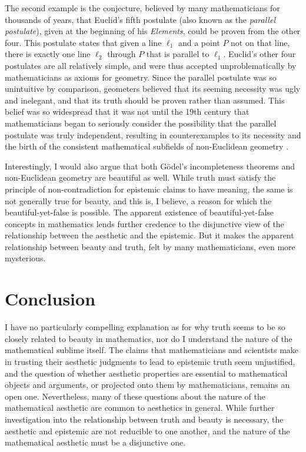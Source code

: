 \documentclass[a4paper,man,natbib]{apa6}
\begin{document}
The second example is the conjecture, believed by many mathematicians for thousands of years, that Euclid's fifth
postulate (also known as the \textit{parallel postulate}), given at the beginning of his \textit{Elements}, could 
be proven from the other four. This postulate states that given a line $\ell_1$ and a point $P$ not on that line, 
there is exactly one line $\ell_2$ through $P$ that is parallel to $\ell_1$. Euclid's other four postulates are all 
relatively simple, 
and were thus accepted unproblematically by mathematicians as axioms for geometry. Since the parallel
postulate was so unintuitive by comparison, geometers believed that its seeming necessity was ugly and inelegant, and
that its truth should be proven rather than assumed. This belief was so widespread that it was not until
the 19th century that mathematicians began to seriously consider the possibility that the parallel postulate was
truly independent, resulting in counterexamples to its necessity and the birth of the consistent mathematical
subfields of non-Euclidean geometry \citep{sep-epistemology-geometry}. 

Interestingly, I would also argue that both Gödel's incompleteness theorems and non-Euclidean geometry are beautiful
as well. While truth must satisfy the principle of non-contradiction for epistemic claims to have meaning, the 
same is not generally true for beauty, and this is, I believe, a reason for which the beautiful-yet-false is possible.
The apparent existence of beautiful-yet-false concepts in mathematics lends further credence to the disjunctive
view of the relationship between the aesthetic and the epistemic. But it makes the apparent relationship between
beauty and truth, felt by many mathematicians, even more mysterious.

\section{Conclusion}

I have no particularly compelling explanation as for why truth seems to be so closely related to beauty in mathematics,
nor do I understand the nature of the mathematical sublime itself. The claims that mathematicians and scientists make
in trusting their aesthetic judgments to lead to epistemic truth seem unjustified, and the question of whether
aesthetic properties are essential to mathematical objects and arguments, or projected onto them by mathematicians,
remains an open one. Nevertheless, many of these questions about the nature of the mathematical aesthetic are
common to aesthetics in general. While further investigation into the relationship between truth and beauty is
necessary, the aesthetic and epistemic are not reducible to one another, and the nature of the mathematical
aesthetic must be a disjunctive one.
\end{document}
